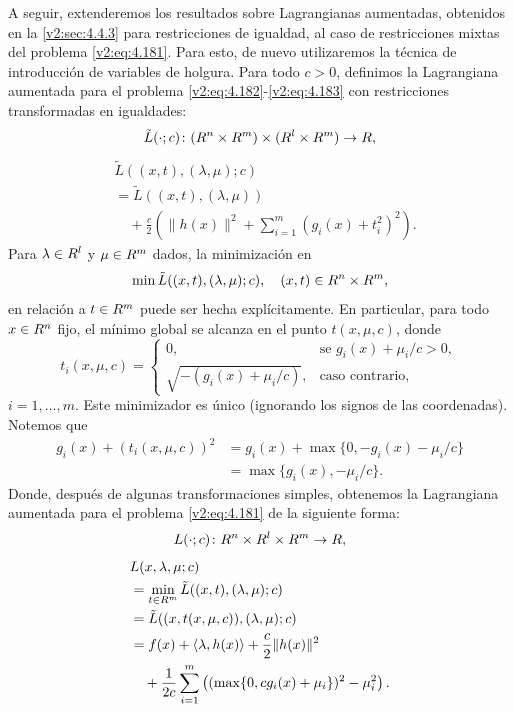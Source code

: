 A seguir, extenderemos los resultados sobre Lagrangianas aumentadas, obtenidos en la \cref{v2:sec:4.4.3} para restricciones de igualdad, al caso de restricciones mixtas del problema \eqref{v2:eq:4.181}. Para esto, de nuevo utilizaremos la técnica de introducción de variables de holgura.
Para todo $c > 0$, definimos la Lagrangiana aumentada para el problema \eqref{v2:eq:4.182}-\eqref{v2:eq:4.183} con restricciones transformadas en igualdades:
\[
    \tilde{L}(\cdot; c) \colon (R^n \times R^m) \times (R^l \times R^m) \to R,
\]
\begin{align}
    &\tilde{L}((x, t), (\lambda, \mu); c) \nonumber \\
    &= \tilde{L}((x, t), (\lambda, \mu)) \nonumber \\
    &\quad + \frac{c}{2} \left( \|h(x)\|^2 + \sum_{i=1}^m (g_i(x) + t_i^2)^2 \right).
    \label{v2:eq:4.206}
\end{align}
Para $\lambda \in R^l$ y $\mu \in R^m$ dados, la minimización en
\begin{equation}
    \min \tilde{L}((x, t), (\lambda, \mu); c), \quad (x, t) \in R^n \times R^m,
    \label{v2:eq:4.207}
\end{equation}
en relación a $t \in R^m$ puede ser hecha explícitamente. En particular, para todo $x \in R^n$ fijo, el mínimo global se alcanza en el punto $t(x, \mu, c)$, donde
\begin{equation}
    t_i(x, \mu, c) = \begin{cases}
        0, & \text{se } g_i(x) + \mu_i/c > 0, \\
        \sqrt{-(g_i(x) + \mu_i/c)}, & \text{caso contrario},
    \end{cases}
    \label{v2:eq:4.208}
\end{equation}
$i = 1, \dots, m$. Este minimizador es único (ignorando los signos de las coordenadas).
Notemos que
\begin{align}
    g_i(x) + (t_i(x, \mu, c))^2 &= g_i(x) + \max\{0, -g_i(x) - \mu_i/c\} \nonumber \\
    &= \max\{g_i(x), -\mu_i/c\}.
    \label{v2:eq:4.209}
\end{align}
Donde, después de algunas transformaciones simples, obtenemos la Lagrangiana aumentada para el problema \eqref{v2:eq:4.181} de la siguiente forma:
\[
    L(\cdot; c) \colon R^n \times R^l \times R^m \to R,
\]
\begin{align}
    &L(x, \lambda, \mu; c) \nonumber \\
    &= \min_{t \in R^m} \tilde{L}((x, t), (\lambda, \mu); c) \nonumber \\
    &= \tilde{L}((x, t(x, \mu, c)), (\lambda, \mu); c) \nonumber \\
    &= f(x) + \langle \lambda, h(x) \rangle + \frac{c}{2}\|h(x)\|^2 \nonumber \\
    &\quad + \frac{1}{2c} \sum_{i=1}^m \left( (\max\{0, c g_i(x) + \mu_i\})^2 - \mu_i^2 \right).
    \label{v2:eq:4.210}
\end{align}
